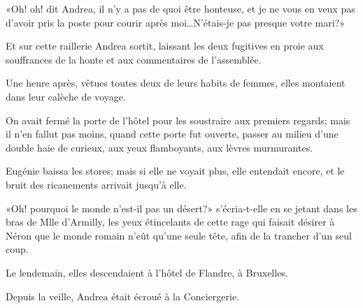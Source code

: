 «Oh! oh! dit Andrea, il n'y a pas de quoi être honteuse, et je ne vous en veux pas d'avoir pris la poste pour courir après moi\dots N'étais-je pas presque votre mari?» 

Et sur cette raillerie Andrea sortit, laissant les deux fugitives en proie aux souffrances de la honte et aux commentaires de l'assemblée. 

Une heure après, vêtues toutes deux de leurs habits de femmes, elles montaient dans leur calèche de voyage. 

On avait fermé la porte de l'hôtel pour les soustraire aux premiers regards; mais il n'en fallut pas moins, quand cette porte fut ouverte, passer au milieu d'une double haie de curieux, aux yeux flamboyants, aux lèvres murmurantes. 

Eugénie baissa les stores; mais si elle ne voyait plus, elle entendait encore, et le bruit des ricanements arrivait jusqu'à elle. 

«Oh! pourquoi le monde n'est-il pas un désert?» s'écria-t-elle en se jetant dans les bras de Mlle d'Armilly, les yeux étincelants de cette rage qui faisait désirer à Néron que le monde romain n'eût qu'une seule tête, afin de la trancher d'un seul coup. 

Le lendemain, elles descendaient à l'hôtel de Flandre, à Bruxelles. 

Depuis la veille, Andrea était écroué à la Conciergerie. 